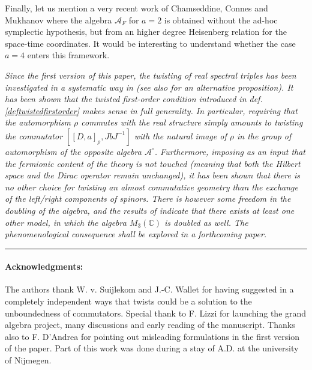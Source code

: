 \documentclass[11pt]{article}
\newcommand{\A}{\mathcal A}
\begin{document}
Finally, let us mention a very recent work of Chamseddine, Connes and
Mukhanov \cite{quanta-geom}
where the algebra $\A_F$ for $a=2$ is obtained without the
ad-hoc symplectic hypothesis, but from an higher degree Heisenberg
relation for the space-time coordinates. It
would be interesting to understand whether the case $a=4$ enters this
framework.
\bigskip

\emph{Since the first version of this paper, the twisting of real spectral triples
has been investigated in a systematic way in
\cite{Landi:2015aa} (see also \cite{T.-Brzezinski:2016aa} for an
alternative proposition). It has been shown that the 
twisted
first-order condition introduced in def. \ref{deftwistedfirstorder}
makes sense in full
generality. In particular, requiring that
the automorphism $\rho$ commutes with the real structure simply
amounts to twisting the commutator $[[D,a]_\rho, JbJ^{-1}]$ with the natural
image of $\rho$ in the group of automorphism of the opposite algebra
$\A^\circ$. Furthermore, imposing as an input that the
fermionic content of the theory is not touched (meaning that
both the Hilbert space and the Dirac operator remain unchanged), it has
been shown that there is no other choice for twisting an almost
commutative geometry than the exchange of the left/right components of spinors. There is however
some freedom in the doubling of the algebra, and the results of
\cite{Landi:2015aa} indicate that there exists at least one other model,
 in which the algebra $M_3(\mathbb C)$ is doubled as well. The
phenomenological consequence shall be explored in a
forthcoming paper.} 


\vspace{.5truecm}
\begin{center}
\rule{5cm}{.5pt}
\end{center}
\vspace{.5truecm}

 \paragraph{Acknowledgments:}
The authors thank W. v. Suijlekom and J.-C. Wallet for having suggested
in a completely independent ways that twists could be a solution to
the unboundedness of commutators. Special thank to F. Lizzi for
launching the grand algebra project, many discussions and early
reading of the manuscript. Thanks also to F. D'Andrea for
pointing out misleading formulations in the first version of the
paper. Part of this
work was done during a stay of A.D. at the university of Nijmegen.
 
\end{document}
